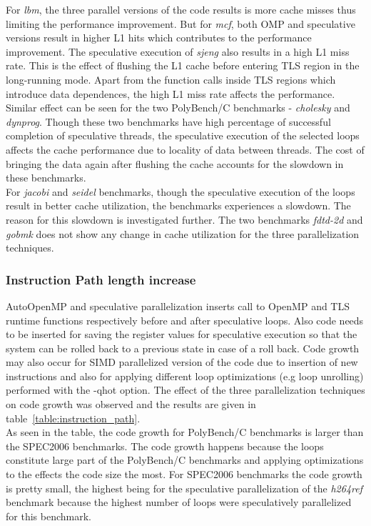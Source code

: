 \documentclass[10pt]{report}          %
\begin{document}
For \textit{lbm}, the three parallel versions of the code results is more cache misses thus limiting the performance improvement.  But for \textit{mcf}, both OMP and speculative versions result in higher L1 hits which contributes to the performance improvement.  The speculative execution of \textit{sjeng} also results in a high L1 miss rate.  This is the effect of flushing the L1 cache before entering TLS region in the long-running mode.  Apart from the function calls inside TLS regions which introduce data dependences, the high L1 miss rate affects the performance. \\

Similar effect can be seen for the two PolyBench/C benchmarks - \textit{cholesky} and \textit{dynprog}.  Though these two benchmarks have high percentage of successful completion of speculative threads, the speculative execution of the selected loops affects the cache performance due to locality of data between threads.  The cost of bringing the data again after flushing the cache accounts for the slowdown in these benchmarks. \\

For \textit{jacobi} and \textit{seidel} benchmarks, though the speculative execution of the loops result in better cache utilization, the benchmarks experiences a slowdown.  The reason for this slowdown is investigated further.  The two benchmarks \textit{fdtd-2d} and \textit{gobmk} does not show any change in cache utilization for the three parallelization techniques.

\subsubsection{Instruction Path length increase}

AutoOpenMP and speculative parallelization inserts call to OpenMP and TLS runtime functions respectively before and after speculative loops.  Also code needs to be inserted for saving the register values for speculative execution so that the system can be rolled back to a previous state in case of a roll back.  Code growth may also occur for SIMD parallelized version of the code due to insertion of new instructions and also for applying different loop optimizations (e.g loop unrolling) performed with the -qhot option.  The effect of the three parallelization techniques on code growth was observed and the results are given in table~\ref{table:instruction_path}. \\

As seen in the table, the code growth for PolyBench/C benchmarks is larger than the SPEC2006 benchmarks.  The code growth happens because the loops constitute large part of the PolyBench/C benchmarks and applying optimizations to the effects the code size the most.  For SPEC2006 benchmarks the code growth is pretty small, the highest being for the speculative parallelization of the \textit{h264ref} benchmark because the highest number of loops were speculatively parallelized for this benchmark. \\
\end{document}
